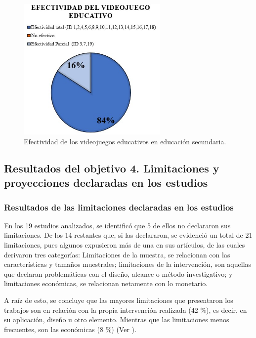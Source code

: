 \documentclass[spanish]{textolivre}
\begin{document}
\begin{figure}[htbp]
 \centering
 \includegraphics[width=0.65\textwidth]{Fig3.jpg}
 \caption{Efectividad de los videojuegos educativos en educación secundaria.}
 \label{fig03}
\end{figure}


\subsection{Resultados del objetivo 4. Limitaciones y proyecciones declaradas en los estudios}\label{sec-format-simple}

\subsubsection{Resultados de las limitaciones declaradas en los estudios}\label{sec-format-simple}

En los 19 estudios analizados, se identificó que 5 de ellos no declararon sus limitaciones. De los 14 restantes que, si las declararon, se evidenció un total de 21 limitaciones, pues algunos expusieron más de una en sus artículos, de las cuales derivaron tres categorías: Limitaciones de la muestra, se relacionan con las características y tamaños muestrales; limitaciones de la intervención, son aquellas que declaran problemáticas con el diseño, alcance o método investigativo; y limitaciones económicas, se relacionan netamente con lo monetario. 

A raíz de esto, se concluye que las mayores limitaciones que presentaron los trabajos son en relación con la propia intervención realizada (42 \%), es decir, en su aplicación, diseño u otro elemento. Mientras que las limitaciones menos frecuentes, son las económicas (8 \%) (Ver ).
\end{document}
